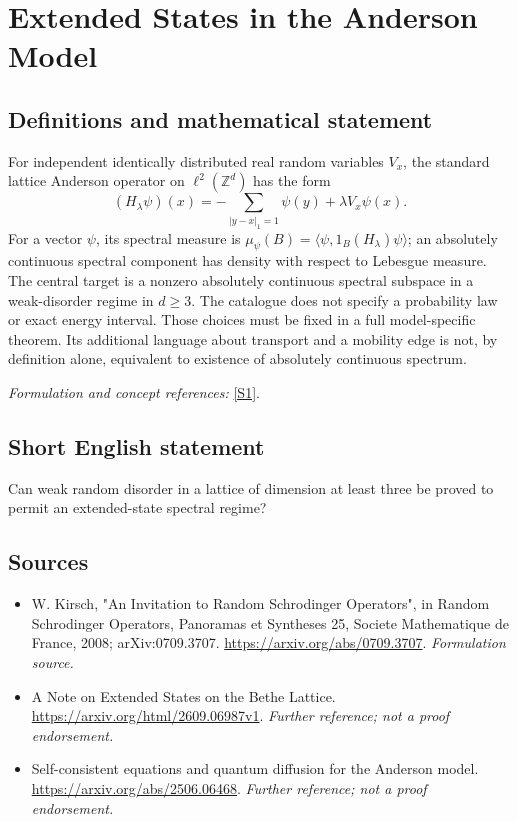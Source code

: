 \documentclass[11pt]{article}
\begin{document}
\section*{\texorpdfstring{Extended States in the Anderson Model}{Extended States in the Anderson Model}}\label{statement}
\subsection{Definitions and mathematical statement}
For independent identically distributed real random variables $V_x$, the standard lattice Anderson operator on $\ell^2({\mathbb{Z}}^d)$ has the form
\[
 (H_\lambda\psi)(x)=-\sum_{|y-x|_1=1}\psi(y)+\lambda V_x\psi(x).
\]
For a vector $\psi$, its spectral measure is $\mu_\psi(B)=\langle\psi,1_B(H_\lambda)\psi\rangle$; an absolutely continuous spectral component has density with respect to Lebesgue measure. The central target is a nonzero absolutely continuous spectral subspace in a weak-disorder regime in $d\ge3$. The catalogue does not specify a probability law or exact energy interval. Those choices must be fixed in a full model-specific theorem. Its additional language about transport and a mobility edge is not, by definition alone, equivalent to existence of absolutely continuous spectrum.
\par\smallskip\textit{Formulation and concept references:} \href{https://arxiv.org/abs/0709.3707}{[S1]}.

\subsection{Short English statement}
Can weak random disorder in a lattice of dimension at least three be proved to permit an extended-state spectral regime?
\subsection{Sources}
\begin{itemize}
\item[S1]W. Kirsch, "An Invitation to Random Schrodinger Operators", in Random Schrodinger Operators, Panoramas et Syntheses 25, Societe Mathematique de France, 2008; arXiv:0709.3707.
\url{https://arxiv.org/abs/0709.3707}.
\textit{Formulation source.}
\item[S2]A Note on Extended States on the Bethe Lattice.
\url{https://arxiv.org/html/2609.06987v1}.
\textit{Further reference; not a proof endorsement.}
\item[S3]Self-consistent equations and quantum diffusion for the Anderson model.
\url{https://arxiv.org/abs/2506.06468}.
\textit{Further reference; not a proof endorsement.}
\end{itemize}
\end{document}
